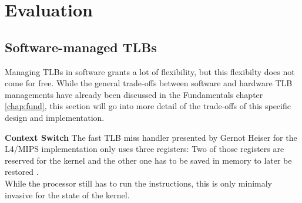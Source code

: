 \chapter{Evaluation}
\label{chap:eval}










\section{Software-managed TLBs}
Managing TLBs in software grants a lot of flexibility, but this flexibilty does not come
for free. While the general trade-offs between software and hardware TLB managements have
already been discussed in the Fundamentals chapter \ref{chap:fund}, this section will
go into more detail of the trade-offs of this specific design and implementation.

\textbf{Context Switch} The fast TLB miss handler presented by Gernot Heiser for the
L4/MIPS implementation only uses three registers: Two of those registers are reserved
for the kernel and the other one has to be saved in memory to later be restored \cite{heiserAnatomyHighPerformanceMicrokernel}.
\\While the processor still has to run the instructions, this is only minimaly invasive
for the state of the kernel.

